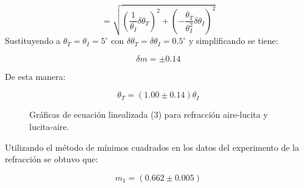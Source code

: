 \documentclass[DIV=calc, paper=a4, fontsize=11pt]{scrartcl}
\begin{document}
\begin{equation*}
    =\sqrt{\left( \frac{1}{\theta_{I}} \delta \theta_{T}\right)^2 +\left( -\frac{\theta_{T}}{\theta_{I}^2} \delta \theta_{I}\right)^2 }
\end{equation*}
Sustituyendo a $\theta_{T}=\theta_{I}=5^{\circ}$ con $\delta \theta_{T}=\delta \theta_{I}=0.5^{\circ} $ y simplificando se tiene:

\begin{equation*}
   \delta m = \pm 0.14
\end{equation*}

De esta manera:

\begin{equation*}
   \theta_{T}=(1.00\pm0.14)\theta_{I}
\end{equation*}

\begin{figure}[H]
 \centering
    \caption{Gráficas de ecuación linealizada (3) para refracción aire-lucita y lucita-aire.}
     \label{f:Lambert3}
\end{figure}

Utilizando el método de mínimos cuadrados en los datos del experimento de la refracción se obtuvo que:

\begin{equation*}
    m_{1}=(0.662 \pm 0.005)
\end{equation*}
\end{document}
